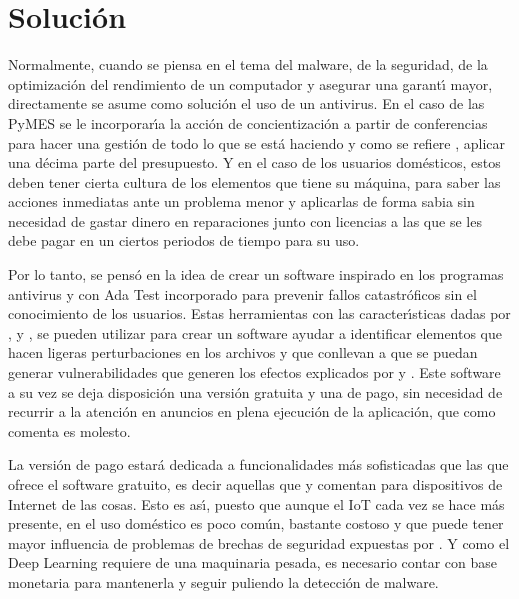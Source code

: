 \pagebreak
\section{Soluci\'on}

Normalmente, cuando se piensa en el tema del malware, de la seguridad, de la
optimizaci\'on del rendimiento de un computador y asegurar una garant\'{\i} mayor,
directamente se asume como soluci\'on el uso de un antivirus. En el caso de las
PyMES se le incorporar\'{\i}a la acci\'on de concientizaci\'on a partir de conferencias
para hacer una gesti\'on de todo lo que se est\'a haciendo y como se refiere
\textcite{Bueno2022}, aplicar una d\'ecima parte del presupuesto. Y en el caso de
los usuarios dom\'esticos, estos deben tener cierta cultura de los elementos que
tiene su m\'aquina, para saber las acciones inmediatas ante un problema menor y
aplicarlas de forma sabia sin necesidad de gastar dinero en reparaciones junto
con licencias a las que se les debe pagar en un ciertos periodos de tiempo para
su uso.

Por lo tanto, se pens\'o en la idea de crear un software inspirado en los
programas antivirus y con Ada Test incorporado para prevenir fallos
catastr\'oficos sin el conocimiento de los usuarios. Estas herramientas con las
caracter\'{\i}sticas dadas por \textcite{Chen2023}, \textcite{Ortiz2024} y
\textcite{Zailani2021}, se pueden utilizar para crear un software ayudar a
identificar elementos que hacen ligeras perturbaciones en los archivos y que
conllevan a que se puedan generar vulnerabilidades que generen los efectos
explicados por \textcite{Mosquera2019} y \textcite{Rosli2019}. Este software a
su vez se deja disposici\'on una versi\'on gratuita y una de pago, sin necesidad de
recurrir a la atenci\'on en anuncios en plena ejecuci\'on de la aplicaci\'on, que
como comenta \textcite{Hartl2023} es molesto.

La versi\'on de pago estar\'a dedicada a funcionalidades m\'as sofisticadas que las
que ofrece el software gratuito, es decir aquellas que \textcite{Singh2022} y
\textcite{Waqar2023} comentan para dispositivos de Internet de las cosas.
Esto es as\'{\i}, puesto que aunque el IoT cada vez se hace m\'as presente, en el uso
dom\'estico es poco com\'un, bastante costoso y que puede tener mayor influencia
de problemas de brechas de seguridad expuestas por \textcite{Rosli2019}. Y como
el Deep Learning requiere de una maquinaria pesada, es necesario contar con
base monetaria para mantenerla y seguir puliendo la detecci\'on de malware.

